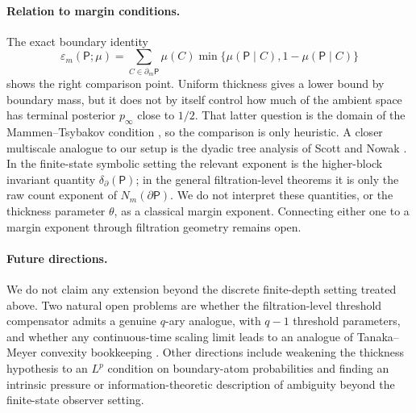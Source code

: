 \documentclass{etds}%
\numberwithin{equation}{section}
\theoremstyle{plain}
\theoremstyle{definition}
\theoremstyle{remark}
\begin{document}
\paragraph{Relation to margin conditions.}
The exact boundary identity
\[
\varepsilon_m(\mathsf{P};\mu)
=\sum_{C\in\partial_m\mathsf{P}}
\mu(C)\min\{\mu(\mathsf{P}\mid C),1-\mu(\mathsf{P}\mid C)\}
\]
shows the right comparison point.  Uniform thickness gives a lower bound by
boundary mass, but it does not by itself control how much of the ambient space
has terminal posterior $p_\infty$ close to $1/2$.  That latter question is the
domain of the Mammen--Tsybakov condition
\cite{MammenTsybakov1999,Tsybakov2004}, so the comparison is only heuristic.
A closer multiscale analogue to our setup is the dyadic tree analysis of Scott and Nowak
\cite{ScottNowak2006Dyadic}.  In the finite-state symbolic setting the relevant
exponent is the higher-block invariant quantity
$\delta_\partial(\mathsf{P})$; in the general filtration-level theorems it is
only the raw count exponent of $N_m(\partial\mathsf{P})$.  We do not interpret
these quantities, or the thickness parameter $\theta$, as a classical margin
exponent.  Connecting either one to a margin exponent through filtration
geometry remains open.

\paragraph{Future directions.}
We do not claim any extension beyond the discrete finite-depth setting treated
above.  Two natural open problems are whether the filtration-level threshold
compensator admits a genuine $q$-ary analogue, with $q-1$ threshold
parameters, and whether any continuous-time scaling limit leads to an analogue
of Tanaka--Meyer convexity bookkeeping \cite{RevuzYor1999}.  Other directions
include weakening the thickness hypothesis to an $L^p$ condition on
boundary-atom probabilities and finding an intrinsic pressure or
information-theoretic description of ambiguity beyond the finite-state
observer setting.
\end{document}
